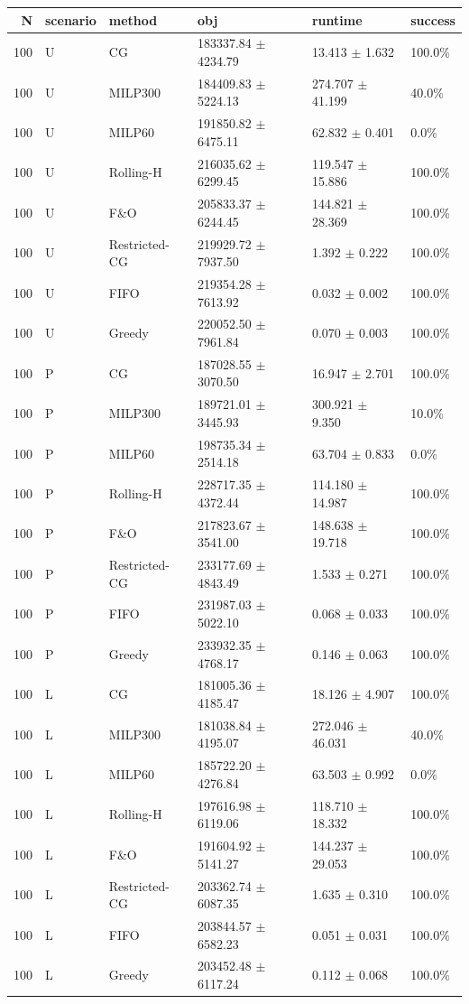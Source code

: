 \begin{tabular}{rlllll}
\toprule
N & scenario & method & obj & runtime & success \\
\midrule
100 & U & CG & 183337.84 $\pm$ 4234.79 & 13.413 $\pm$ 1.632 & 100.0\% \\
100 & U & MILP300 & 184409.83 $\pm$ 5224.13 & 274.707 $\pm$ 41.199 & 40.0\% \\
100 & U & MILP60 & 191850.82 $\pm$ 6475.11 & 62.832 $\pm$ 0.401 & 0.0\% \\
100 & U & Rolling-H & 216035.62 $\pm$ 6299.45 & 119.547 $\pm$ 15.886 & 100.0\% \\
100 & U & F\&O & 205833.37 $\pm$ 6244.45 & 144.821 $\pm$ 28.369 & 100.0\% \\
100 & U & Restricted-CG & 219929.72 $\pm$ 7937.50 & 1.392 $\pm$ 0.222 & 100.0\% \\
100 & U & FIFO & 219354.28 $\pm$ 7613.92 & 0.032 $\pm$ 0.002 & 100.0\% \\
100 & U & Greedy & 220052.50 $\pm$ 7961.84 & 0.070 $\pm$ 0.003 & 100.0\% \\
100 & P & CG & 187028.55 $\pm$ 3070.50 & 16.947 $\pm$ 2.701 & 100.0\% \\
100 & P & MILP300 & 189721.01 $\pm$ 3445.93 & 300.921 $\pm$ 9.350 & 10.0\% \\
100 & P & MILP60 & 198735.34 $\pm$ 2514.18 & 63.704 $\pm$ 0.833 & 0.0\% \\
100 & P & Rolling-H & 228717.35 $\pm$ 4372.44 & 114.180 $\pm$ 14.987 & 100.0\% \\
100 & P & F\&O & 217823.67 $\pm$ 3541.00 & 148.638 $\pm$ 19.718 & 100.0\% \\
100 & P & Restricted-CG & 233177.69 $\pm$ 4843.49 & 1.533 $\pm$ 0.271 & 100.0\% \\
100 & P & FIFO & 231987.03 $\pm$ 5022.10 & 0.068 $\pm$ 0.033 & 100.0\% \\
100 & P & Greedy & 233932.35 $\pm$ 4768.17 & 0.146 $\pm$ 0.063 & 100.0\% \\
100 & L & CG & 181005.36 $\pm$ 4185.47 & 18.126 $\pm$ 4.907 & 100.0\% \\
100 & L & MILP300 & 181038.84 $\pm$ 4195.07 & 272.046 $\pm$ 46.031 & 40.0\% \\
100 & L & MILP60 & 185722.20 $\pm$ 4276.84 & 63.503 $\pm$ 0.992 & 0.0\% \\
100 & L & Rolling-H & 197616.98 $\pm$ 6119.06 & 118.710 $\pm$ 18.332 & 100.0\% \\
100 & L & F\&O & 191604.92 $\pm$ 5141.27 & 144.237 $\pm$ 29.053 & 100.0\% \\
100 & L & Restricted-CG & 203362.74 $\pm$ 6087.35 & 1.635 $\pm$ 0.310 & 100.0\% \\
100 & L & FIFO & 203844.57 $\pm$ 6582.23 & 0.051 $\pm$ 0.031 & 100.0\% \\
100 & L & Greedy & 203452.48 $\pm$ 6117.24 & 0.112 $\pm$ 0.068 & 100.0\% \\
\bottomrule
\end{tabular}
